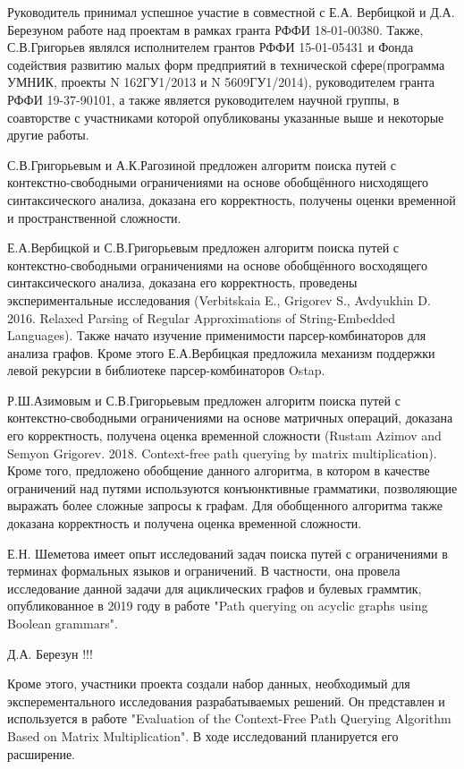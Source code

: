 \documentclass[12pt]{article}  %
\theoremstyle{remark}
\begin{document}
Руководитель принимал успешное участие в совместной с Е.А. Вербицкой и Д.А. Березуном работе над проектам в рамках гранта РФФИ 18-01-00380.
Также, С.В.Григорьев являлся исполнителем грантов РФФИ 15-01-05431 и Фонда содействия развитию малых форм предприятий в технической сфере(программа УМНИК, проекты N 162ГУ1/2013 и N 5609ГУ1/2014), руководителем гранта РФФИ 19-37-90101, а также является руководителем научной группы, в соавторстве с участниками которой опубликованы указанные выше и некоторые другие работы.

С.В.Григорьевым и А.К.Рагозиной предложен алгоритм поиска путей с контекстно-свободными ограничениями на основе обобщённого нисходящего синтаксического анализа, доказана его корректность, получены оценки временной и пространственной сложности.

Е.А.Вербицкой и С.В.Григорьевым предложен алгоритм поиска путей с контекстно-свободными ограничениями на основе обобщённого восходящего синтаксического анализа, доказана его корректность, проведены экспериментальные исследования (Verbitskaia E., Grigorev S., Avdyukhin D. 2016. Relaxed Parsing of Regular Approximations of String-Embedded Languages). Также начато изучение применимости парсер-комбинаторов для анализа графов. Кроме этого Е.А.Вербицкая предложила механизм поддержки левой рекурсии в библиотеке парсер-комбинаторов Ostap.

Р.Ш.Азимовым и С.В.Григорьевым предложен алгоритм поиска путей с контекстно-свободными ограничениями на основе матричных операций, доказана его корректность, получена оценка временной сложности (Rustam Azimov and Semyon Grigorev. 2018. Context-free path querying by matrix multiplication). Кроме того, предложено обобщение данного алгоритма, в котором в качестве ограничений над путями используются конъюнктивные грамматики, позволяющие выражать более сложные запросы к графам. Для обобщенного алгоритма также доказана корректность и получена оценка временной сложности.

Е.Н. Шеметова имеет опыт исследований задач поиска путей с ограничениями в терминах формальных языков и ограничений. В частности, она провела исследование данной задачи для ациклических графов и булевых граммтик, опубликованное в 2019 году в работе "Path querying on acyclic graphs using Boolean grammars".

Д.А. Березун !!!

Кроме этого, участники проекта создали набор данных, необходимый для эксперементального исследования разрабатываемых решений. Он представлен и используется в работе "Evaluation of the Context-Free Path Querying Algorithm Based on Matrix Multiplication". В ходе исследований планируется его расширение.
\end{document}
